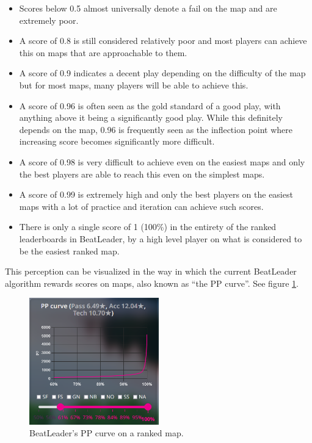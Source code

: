 \documentclass[12pt,a4paper]{article}
\begin{document}
\begin{itemize}

\item Scores below 0.5 almost universally denote a fail on the map and are extremely poor.
\item A score of 0.8 is still considered relatively poor and most players can achieve this on maps that are approachable to them.
\item A score of 0.9 indicates a decent play depending on the difficulty of the map but for most maps, many players will be able to achieve this.
\item A score of 0.96 is often seen as the gold standard of a good play, with anything above it being a significantly good play. While this definitely depends on the map, 0.96 is frequently seen as the inflection point where increasing score becomes significantly more difficult.
\item A score of 0.98 is very difficult to achieve even on the easiest maps and only the best players are able to reach this even on the simplest maps.
\item A score of 0.99 is extremely high and only the best players on the easiest maps with a lot of practice and iteration can achieve such scores.
\item There is only a single score of 1 (100\%) in the entirety of the ranked leaderboards in BeatLeader, by a high level player on what is considered to be the easiest ranked map.

\end{itemize}

This perception can be visualized in the way in which the current BeatLeader algorithm rewards scores on maps, also known as ``the PP curve''. See figure \ref{PP_curve}.

\begin{figure}
\label{PP_curve}
\caption{BeatLeader's PP curve on a ranked map.}
\includegraphics[width=0.5\textwidth]{PPcurve.png}
\centering
\end{figure}
\end{document}
